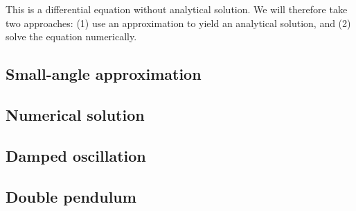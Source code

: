 This is a differential equation without analytical solution. We will therefore take two approaches: (1) use an approximation to yield an analytical solution, and (2) solve the equation numerically.

\subsection{Small-angle approximation}
\subsection{Numerical solution}
\subsection{Damped oscillation}
\subsection{Double pendulum}

